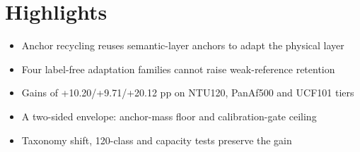 \documentclass{article}
\begin{document}
\section*{Highlights}
\begin{itemize}
\item Anchor recycling reuses semantic-layer anchors to adapt the physical layer
\item Four label-free adaptation families cannot raise weak-reference retention
\item Gains of +10.20/+9.71/+20.12 pp on NTU120, PanAf500 and UCF101 tiers
\item A two-sided envelope: anchor-mass floor and calibration-gate ceiling
\item Taxonomy shift, 120-class and capacity tests preserve the gain
\end{itemize}
\end{document}

